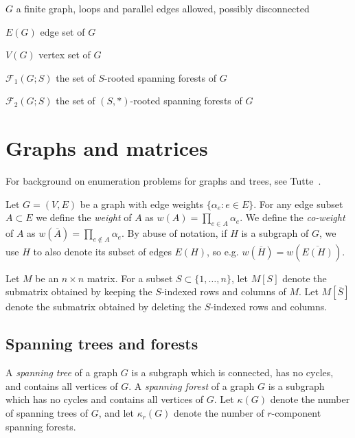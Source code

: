 \documentclass{amsart}
\theoremstyle{definition}
\newcommand{\RR}{\mathbb{R}}
\newcommand{\trees}{\mathcal{F}_1}
\newcommand{\forests}{\mathcal{F}}
\newcommand{\coweight}[1]{w(\overline{#1})}
\newcommand{\note}[1]{{\color{red} \sf $\diamondsuit$  {#1} $\diamondsuit$ }}
\begin{document}

$G$ a finite graph, 
loops and parallel edges allowed,
possibly disconnected

$E(G)$ edge set of $G$

$V(G)$ vertex set of $G$




%

$\trees(G;S)$ the set of $S$-rooted spanning forests of $G$

$\forests_2(G;S)$ the set of $(S,*)$-rooted spanning forests of $G$


\section{Graphs and matrices}
\label{sec:graphs-matrices}

For background on enumeration problems for graphs and trees, 
see 
Tutte~\cite[Chapter VI]{tutte}. 

Let $G = (V, E)$ be a graph with edge weights $\{ \alpha_e : e \in E\}$.
For any edge subset $A \subset E$ we define the {\em weight} of $A$ as
$\displaystyle
	w(A) = \prod_{e \in A} \alpha_e.
$
We define the {\em co-weight} of $A$ as
$\displaystyle
	w(\overline A) = \prod_{e \not\in A} \alpha_e.
$
By abuse of notation, if $H$ is a subgraph of $G$, we use $H$ to also denote its subset of edges $E(H)$, so e.g. $\coweight{H} = \coweight{E(H)}$.

Let $M$ be an $n \times n$ matrix.
For a subset $S \subset \{1, \ldots, n\}$, 
let $M[S]$ denote the submatrix obtained by keeping the $S$-indexed rows and columns of $M$.
Let $M[\overline{S}]$ denote the submatrix obtained by deleting the $S$-indexed rows and columns.

\subsection{Spanning trees and forests}
A {\em spanning tree} of a graph $G$ is a subgraph which 
is connected, has no cycles,
and contains all vertices of $G$.
A {\em spanning forest} of a graph $G$ is a subgraph which 
has no cycles
and 
contains all vertices of $G$. 
Let $\kappa(G)$ denote the number of spanning trees of $G$, and let $\kappa_r(G)$ denote the number of $r$-component spanning forests.
\end{document}
